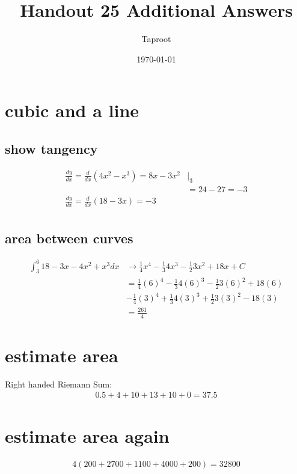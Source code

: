 \documentclass[letterpaper]{article}
\author{Taproot}
\date{\today}
\title{Handout 25 Additional Answers}
\renewcommand{\tableofcontents}{}
\begin{document}
\tableofcontents

\setcounter{section}{10}

\section{cubic and a line}
\label{sec:org73dcfca}

\subsection{show tangency}
\label{sec:org062283f}

\[\begin{aligned}
   \frac{dy}{dx} = \frac{d}{dx}(4 x ^2 - x ^3) = 8 x - 3 x^2&\Bigr|_3\\
   &= 24 - 27 = -3\\
   \frac{dy}{dx} = \frac{d}{dx}(18 - 3 x) = -3 \\
   \end{aligned}\]

\subsection{area between curves}
\label{sec:org8bc175b}

\[\begin{aligned}
    \int_{3}^{6} 18-3x - 4x^2 + x^3 dx &\to \frac{1}{4}x^4 - \frac{1}{3}4x^3 - \frac{1}{2} 3x^2 + 18 x +C\\
	&= \frac{1}{4}(6)^4 - \frac{1}{3}4(6)^3 - \frac{1}{2} 3(6)^2 + 18 (6) \\
	&- \frac{1}{4}(3)^4 + \frac{1}{3}4(3)^3 + \frac{1}{2} 3(3)^2 - 18 (3)\\
	&= \boxed{\frac{261}{4}}
   \end{aligned}\]

\section{estimate area}
\label{sec:org8ac5755}

Right handed Riemann Sum:
\[\begin{aligned}
  0.5 + 4 + 10 + 13 + 10 + 0 = 37.5
  \end{aligned}\]

\section{estimate area again}
\label{sec:org015135d}

\[\begin{aligned}
  4(200 + 2700 + 1100 + 4000 + 200) = 32800
  \end{aligned}\]
\end{document}
